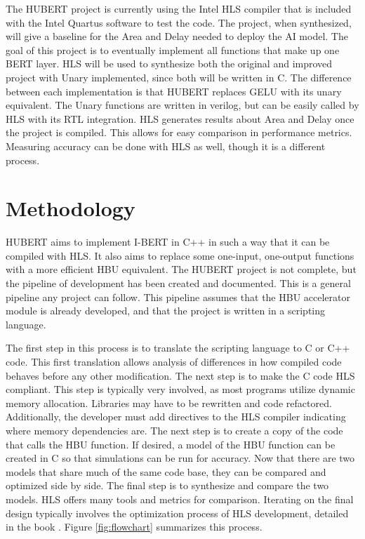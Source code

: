 \documentclass[12pt]{article}
\begin{document}
	The HUBERT project is currently using the Intel HLS compiler that is included with the Intel Quartus software to test the code. The project, when synthesized, will give a baseline for the Area and Delay needed to deploy the AI model. The goal of this project is to eventually implement all functions that make up one BERT layer. HLS will be used to synthesize both the original and improved project with Unary implemented, since both will be written in C. The difference between each implementation is that HUBERT replaces GELU with its unary equivalent. The Unary functions are written in verilog, but can be easily called by HLS with its RTL integration. HLS generates results about Area and Delay once the project is compiled. This allows for easy comparison in performance metrics. Measuring accuracy can be done with HLS as well, though it is a different process.
	\newpage
	\section{Methodology}
	HUBERT aims to implement I-BERT in C++ in such a way that it can be compiled with HLS. It also aims to replace some one-input, one-output functions with a more efficient HBU equivalent. The HUBERT project is not complete, but the pipeline of development has been created and documented. This is a general pipeline any project can follow. This pipeline assumes that the HBU accelerator module is already developed, and that the project is written in a scripting language.
	
	The first step in this process is to translate the scripting language to C or C++ code. This first translation allows analysis of differences in how compiled code behaves before any other modification. The next step is to make the C code HLS compliant. This step is typically very involved, as most programs utilize dynamic memory allocation. Libraries may have to be rewritten and code refactored. Additionally, the developer must add directives to the HLS compiler indicating where memory dependencies are. The next step is to create a copy of the code that calls the HBU function. If desired, a model of the HBU function can be created in C so that simulations can be run for accuracy. Now that there are two models that share much of the same code base, they can be compared and optimized side by side. The final step is to synthesize and compare the two models. HLS offers many tools and metrics for comparison. Iterating on the final design typically involves the optimization process of HLS development, detailed in the book \cite{textbook}. Figure \ref{fig:flowchart} summarizes this process. 
	
\end{document}

